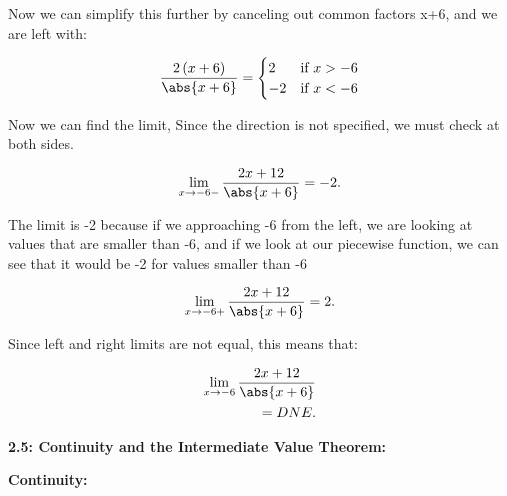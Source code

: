 \documentclass{report}
\begin{document}
        \bigbreak \noindent 
        Now we can simplify this further by canceling out common factors x+6, and we are left with:

        \bigbreak \noindent 
           \begin{equation}
            \frac{2 \left(x+6\right)}{\abs{x+6}} =
                \begin{cases}
                     2 & \text{if } x > -6 \\
                     -2 & \text{if } x < -6 
                \end{cases}
            \end{equation}

        \bigbreak \noindent 
        Now we can find the limit, Since the direction is not specified, we must check at both sides.

        \bigbreak \noindent 
        \begin{align*}
            \lim\limits_{x \to -6- }{\frac{2x+12}{\abs{x+6}}} = -2
        .\end{align*}

        \bigbreak \noindent 
        The limit is -2 because if we approaching -6 from the left, we are looking
        at values that are smaller than -6, and if we look at our piecewise function, we can
        see that it would be -2 for values smaller than -6

        \begin{align*}
            \lim\limits_{x \to -6+}{\frac{2x+12}{\abs{x+6}}} = 2
        .\end{align*}        

        \bigbreak \noindent 
        Since left and right limits are not equal, this means that:

        \begin{align*}
            \lim\limits_{x \to -6}{\frac{2x+12}{\abs{x+6}}} \\ 
            = DNE
        .\end{align*}
        
        \pagebreak
        \begin{Large}
            \noindent \textbf{2.5: Continuity and the Intermediate Value Theorem:}
        \end{Large}

        \bigbreak \noindent \bigbreak \noindent \bigbreak \noindent 
        \begin{large}
            \textbf{Continuity:}
        \end{large}
\end{document}
